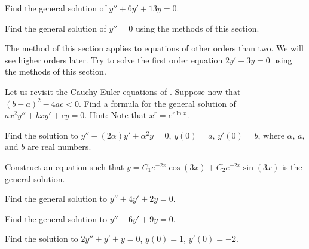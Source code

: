 \begin{exercise}
Find the general solution of $y'' + 6 y' + 13 y = 0$.
\end{exercise}

\begin{exercise}
Find the general solution of $y'' = 0$ using the methods of this section.
\end{exercise}

\begin{exercise}
The method of this section applies to equations of other orders than two.
We will see
higher orders later.  Try to solve the first order equation
$2y' + 3y = 0$ using the methods of this section.
\end{exercise}

\begin{exercise}
Let us revisit the Cauchy-Euler equations of
.  Suppose now
that ${(b-a)}^2-4ac < 0$.  Find a formula for the general solution
of $a x^2 y'' + b x y' + c y = 0$.  Hint: Note that $x^r = e^{r \ln x}$.
\end{exercise}

\begin{exercise}
Find the solution to
$y''-(2\alpha) y' + \alpha^2 y=0$, $y(0) = a$, $y'(0)=b$,
where $\alpha$, $a$, and $b$ are real numbers.
\end{exercise}

\begin{exercise}
Construct an equation such that $y = C_1 e^{-2x} \cos(3x) + C_2 e^{-2x}
\sin(3x)$ is the general
solution.
\end{exercise}

\setcounter{exercise}{100}

\begin{exercise}
Find the general solution to
$y''+4y'+2y=0$.
\end{exercise}

\begin{exercise}
Find the general solution to
$y''-6y'+9y=0$.
\end{exercise}

\begin{exercise}
Find the solution to
$2y''+y'+y=0$, $y(0) = 1$, $y'(0)=-2$.
\end{exercise}


